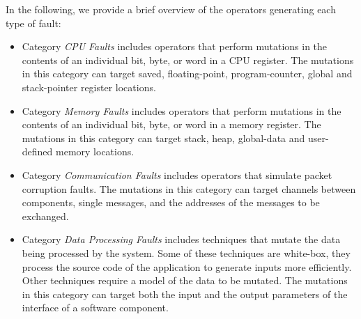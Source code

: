 In the following, we provide a brief overview of the operators generating each type of fault:
\begin{itemize}
	\item Category \emph{CPU Faults} includes operators that perform mutations in the contents of an individual bit, byte, or word in a CPU register. The mutations in this category can target saved, floating-point, program-counter, global and stack-pointer register locations. 
	\item Category \emph{Memory Faults} includes operators that perform mutations in the contents of an individual bit, byte, or word in a memory register. The mutations in this category can target stack, heap, global-data and user-defined memory locations.
	\item Category \emph{Communication Faults} includes operators that simulate packet corruption faults. The mutations in this category can target channels between components, single messages, and the addresses of the messages to be exchanged.
	\item Category \emph{Data Processing Faults} includes techniques that mutate the data being processed by the system. Some of these techniques are white-box, they process the source code of the application to generate inputs more efficiently. Other techniques require a model of the data to be mutated. The mutations in this category can target both the input and the output parameters of the interface of a software component.
\end{itemize}

\newcommand{\FTAPE}{\cite{tsai1999stress}}
\newcommand{\FIAT}{\cite{barton1990fault}}
\newcommand{\GOOFI}{\cite{aidemark2001goofi}}
\newcommand{\DOCTOR}{\cite{han1995doctor}}
\newcommand{\ORCHESTRA}{\cite{dawson1996testing}}
\newcommand{\Fuzz}{\cite{miller1995fuzz}}
\newcommand{\Ballista}{\cite{koopman2000exception}}
\newcommand{\RIDDLE}{\cite{ghosh1998testing}}
\newcommand{\Superion}{\cite{Wang:GrammarAwareFuzzying:ICSE:2019}}
\newcommand{\AFL}{\cite{gutmann2016fuzzing}}
\newcommand{\SAGE}{\cite{godefroid2012sage}}
\newcommand{\pFuzzer}{\cite{mathis2019parser}} 
\newcommand{\MoWF}{\cite{pham2016model}}
\newcommand{\DiNardoICST}{\cite{di2015generating}}
\newcommand{\DiNardoASE}{\cite{di2015evolutionary}}
\newcommand{\Matinnejad}{\cite{Matinnejad19}}
\newcommand{\MongoDB}{\cite{Guo:MongoDBFuzzer:CACM:2017}}
\newcommand{\SOLMI}{\cite{Jan:ISSTA:2016}}
\newcommand{\MUSQL}{\cite{Appelt:SQLI:ISSTA:2014}}

